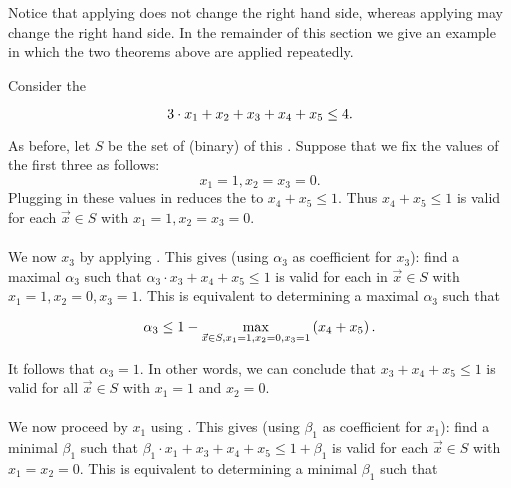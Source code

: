 Notice that applying  does not change the right hand side, whereas applying  may change the right hand side. In the remainder of this section we give an example in which the two theorems above are applied repeatedly.

\begin{example}
Consider the 

\begin{equation}
3\cdot x_1+x_2+x_3+x_4+x_5\leq4\eqnlab{knapsackconstraintexlift}.
\end{equation}

As before, let $S$ be the set of (binary)  of this . Suppose that we fix the values of the first three  as follows:
\begin{equation}
x_1=1, x_2=x_3=0.
\end{equation}
Plugging in these values in  reduces the  to $x_4+x_5\leq1$. Thus $x_4+x_5\leq1$ is valid for each $\vec{x}\in S$ with $x_1=1, x_2=x_3=0$.

\paragraph{}
We now   $x_3$ by applying . This gives (using $\alpha_3$ as coefficient for $x_3$): find a maximal $\alpha_3$ such that $\alpha_3\cdot x_3+x_4+x_5\leq1$ is valid for each in $\vec{x}\in S$ with $x_1=1, x_2=0, x_3=1$. This is equivalent to determining a maximal $\alpha_3$ such that

\begin{equation}
\alpha_3\leq1-\max_{\vec{x}\in S,x_1=1,x_2=0,x_3=1}\left( x_4+x_5 \right).
\end{equation}

It follows that $\alpha_3=1$. In other words, we can conclude that $x_3+x_4+x_5\leq1$ is valid for all $\vec{x}\in S$ with $x_1=1$ and $x_2=0$.

\paragraph{}
We now proceed by   $x_1$ using . This gives (using $\beta_1$ as coefficient for $x_1$): find a minimal $\beta_1$ such that $\beta_1\cdot x_1+x_3+x_4+x_5\leq1+\beta_1$ is valid for each $\vec{x}\in S$ with $x_1=x_2=0$. This is equivalent to determining a minimal $\beta_1$ such that


\end{example}
